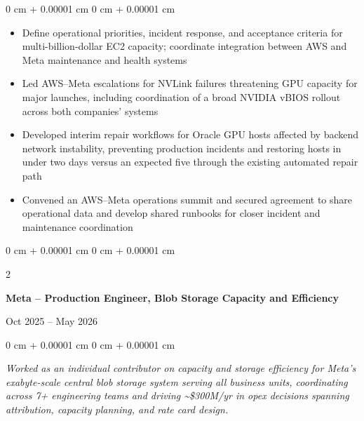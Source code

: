 \documentclass[10pt, letterpaper]{article}
\DeclareRobustCommand{\decorativeicon}[1]{%
    \BeginAccSupp{method=escape,ActualText={}}#1\EndAccSupp{}%
}
\newcommand{\companylogo}[1]{\decorativeicon{#1}\hspace{0.5em}}
\newenvironment{highlights}{
    \begin{itemize}[
        topsep=0.10 cm,
        parsep=0.10 cm,
        partopsep=0pt,
        itemsep=0pt,
        leftmargin=0 cm + 10pt
    ]
}{
    \end{itemize}
} %
\newenvironment{onecolentry}{
    \begin{adjustwidth}{
        0 cm + 0.00001 cm
    }{
        0 cm + 0.00001 cm
    }
}{
    \end{adjustwidth}
} %
\newenvironment{twocolentry}[2][]{
    \needspace{4\baselineskip} %
    \onecolentry
    \def\secondColumn{#2}
    \setcolumnwidth{\fill, 4.5 cm}
    \begin{paracol}{2}
}{
    \switchcolumn \raggedleft \secondColumn
    \end{paracol}
    \endonecolentry
} %
\begin{document}
        \vspace{0.05 cm}
        \begin{onecolentry}
            \begin{highlights}
                \item Define operational priorities, incident response, and acceptance criteria for multi-billion-dollar EC2 capacity; coordinate integration between AWS and Meta maintenance and health systems
                \item Led AWS–Meta escalations for NVLink failures threatening GPU capacity for major launches, including coordination of a broad NVIDIA vBIOS rollout across both companies' systems
                \item Developed interim repair workflows for Oracle GPU hosts affected by backend network instability, preventing production incidents and restoring hosts in under two days versus an expected five through the existing automated repair path
                \item Convened an AWS–Meta operations summit and secured agreement to share operational data and develop shared runbooks for closer incident and maintenance coordination
            \end{highlights}
        \end{onecolentry}

        \vspace{0.2 cm}

        \begin{twocolentry}{
            Oct 2025 – May 2026
        }
            \textbf{\companylogo{\faMeta}Meta – Production Engineer, Blob Storage Capacity and Efficiency}
        \end{twocolentry}

        \vspace{0.05 cm}
        \begin{onecolentry}
            \textit{Worked as an individual contributor on capacity and storage efficiency for Meta's exabyte-scale central blob storage system serving all business units, coordinating across 7+ engineering teams and driving \textasciitilde\$300M/yr in opex decisions spanning attribution, capacity planning, and rate card design.}
        \end{onecolentry}
\end{document}

